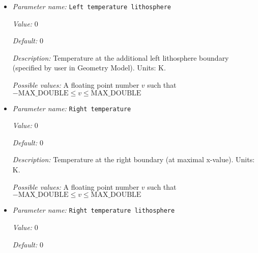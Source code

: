 \begin{itemize}
{\it Possible values:} A floating point number $v$ such that $-\text{MAX\_DOUBLE} \leq v \leq \text{MAX\_DOUBLE}$
\item {\it Parameter name:} {\tt Left temperature lithosphere}
\label{parameters:Boundary temperature model/Box with lithosphere boundary indicators/Left temperature lithosphere}
\label{parameters:Boundary_20temperature_20model/Box_20with_20lithosphere_20boundary_20indicators/Left_20temperature_20lithosphere}


{\it Value:} 0


{\it Default:} 0


{\it Description:} Temperature at the additional left lithosphere boundary (specified by user in Geometry Model). Units: K.


{\it Possible values:} A floating point number $v$ such that $-\text{MAX\_DOUBLE} \leq v \leq \text{MAX\_DOUBLE}$
\item {\it Parameter name:} {\tt Right temperature}
\label{parameters:Boundary temperature model/Box with lithosphere boundary indicators/Right temperature}
\label{parameters:Boundary_20temperature_20model/Box_20with_20lithosphere_20boundary_20indicators/Right_20temperature}


{\it Value:} 0


{\it Default:} 0


{\it Description:} Temperature at the right boundary (at maximal x-value). Units: K.


{\it Possible values:} A floating point number $v$ such that $-\text{MAX\_DOUBLE} \leq v \leq \text{MAX\_DOUBLE}$
\item {\it Parameter name:} {\tt Right temperature lithosphere}
\label{parameters:Boundary temperature model/Box with lithosphere boundary indicators/Right temperature lithosphere}
\label{parameters:Boundary_20temperature_20model/Box_20with_20lithosphere_20boundary_20indicators/Right_20temperature_20lithosphere}


{\it Value:} 0


{\it Default:} 0



\end{itemize}
